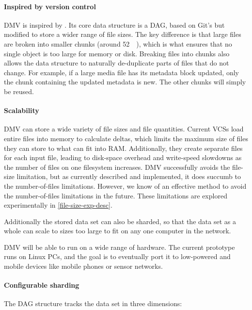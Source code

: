 \paragraph{Inspired by version control}

\gls{DMV} is inspired by . Its core data structure is
a \gls{DAG}, based on Git's but modified to store a wider range of file sizes.
The key difference is that large files are broken into smaller chunks (around
\SI{52}{\kibi\byte}), which is what ensures that no single object is too large
for memory or disk. Breaking files into chunks also allows the data structure to
naturally de-duplicate parts of files that do not change. For example, if a
large media file has its metadata block updated, only the chunk containing the
updated metadata is new. The other chunks will simply be reused.


\paragraph{Scalability}

\gls{DMV} can store a wide variety of file sizes and file quantities. Current
\glspl{VCS} load entire files into memory to calculate deltas, which limits the
maximum size of files they can store to what can fit into RAM. Additionally,
they create separate files for each input file, leading to disk-space overhead
and write-speed slowdowns as the number of files on one filesystem increases.
\gls{DMV} successfully avoids the file-size limitation, but as currently
described and implemented, it does succumb to the number-of-files limitations.
However, we know of an effective method to avoid the number-of-files limitations
in the future. These limitations are explored experimentally in
\autoref{file-size-exp-desc}.

Additionally the stored data set can also be sharded, so that the data set as a
whole can scale to sizes too large to fit on any one computer in the network.

\gls{DMV} will be able to run on a wide range of hardware. The current prototype
runs on Linux PCs, and the goal is to eventually port it to low-powered and
mobile devices like mobile phones or sensor networks.


\paragraph{Configurable sharding}

The \gls{DAG} structure tracks the data set in three dimensions:

